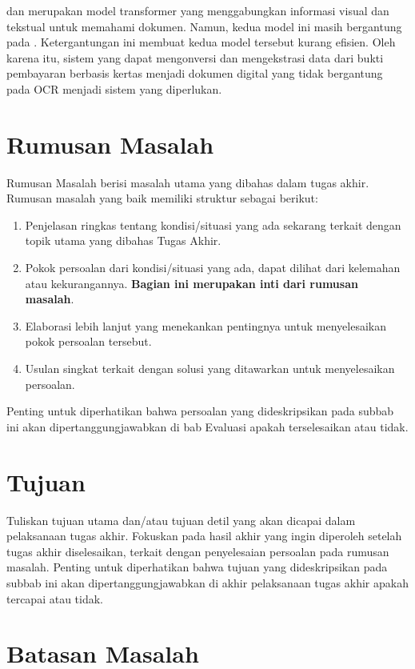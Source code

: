 \layoutlm{} dan \bert{} merupakan model transformer yang menggabungkan informasi visual dan tekstual untuk memahami dokumen. Namun, kedua model ini masih bergantung pada \ocr. Ketergantungan ini membuat kedua model tersebut kurang efisien. Oleh karena itu, sistem yang dapat mengonversi dan mengekstrasi data dari bukti pembayaran berbasis kertas menjadi dokumen digital yang tidak bergantung pada OCR menjadi sistem yang diperlukan. 

\section{Rumusan Masalah}

Rumusan Masalah berisi masalah utama yang dibahas dalam tugas akhir. Rumusan masalah yang baik memiliki struktur sebagai berikut:

\begin{enumerate}
	\item Penjelasan ringkas tentang kondisi/situasi yang ada sekarang terkait dengan topik utama yang dibahas Tugas Akhir.
	\item Pokok persoalan dari kondisi/situasi yang ada, dapat dilihat dari kelemahan atau kekurangannya. \textbf{Bagian ini merupakan inti dari rumusan masalah}.
	\item Elaborasi lebih lanjut yang menekankan pentingnya untuk menyelesaikan pokok persoalan tersebut.
	\item Usulan singkat terkait dengan solusi yang ditawarkan untuk menyelesaikan persoalan.
\end{enumerate}

Penting untuk diperhatikan bahwa persoalan yang dideskripsikan pada subbab ini akan dipertanggungjawabkan di bab Evaluasi apakah terselesaikan atau tidak.

\section{Tujuan}

Tuliskan tujuan utama dan/atau tujuan detil yang akan dicapai dalam pelaksanaan tugas akhir. Fokuskan pada hasil akhir yang ingin diperoleh setelah tugas akhir diselesaikan, terkait dengan penyelesaian persoalan pada rumusan masalah. Penting untuk diperhatikan bahwa tujuan yang dideskripsikan pada subbab ini akan dipertanggungjawabkan di akhir pelaksanaan tugas akhir apakah tercapai atau tidak.

\section{Batasan Masalah}

